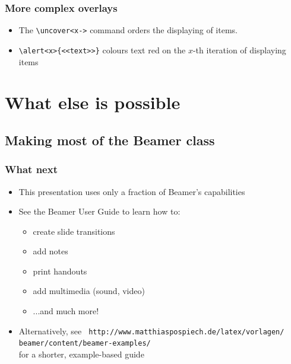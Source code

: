 \documentclass[xcolor=pdftex,t,11pt]{beamer}
\begin{document}
\begin{frame}[fragile]
\frametitle{More complex overlays}
\begin{itemize}
\item The \verb!\uncover<x->! command orders the displaying of items.
\end{itemize}
\begin{semiverbatim}
\end{semiverbatim}
\begin{itemize}
\item \verb!\alert<x>{<<text>>}! \alert<4->{colours text red on the $x$-th iteration of displaying items}
\end{itemize}
\end{frame}


\section{What else is possible}


\subsection{Making most of the Beamer class}

\begin{frame}[fragile]
\frametitle{What next}
\begin{itemize}
\item<1-> This presentation uses only a fraction of Beamer's capabilities
\item<1-> See the Beamer User Guide to learn how to: 
\begin{itemize}
\item<2-> create slide transitions
\item<3-> add notes
\item<4-> print handouts
\item<5-> add multimedia (sound, video)
\item<6-> ...and much more!
\end{itemize}
\item<7-> Alternatively, see \verb! http://www.matthiaspospiech.de/latex/vorlagen/! \verb! beamer/content/beamer-examples/!\\ for a shorter, example-based guide
\end{itemize}
\end{frame}
\end{document}
